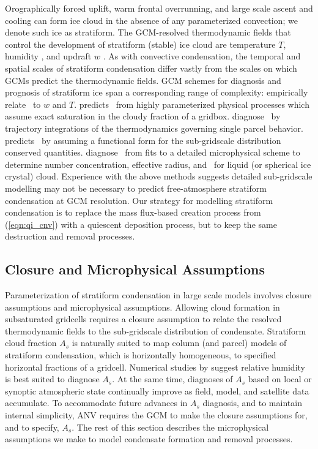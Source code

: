 \documentclass[twoside,agums]{aguplus}
\begin{document}
Orographically forced uplift, warm frontal overrunning, and large
scale ascent and cooling can form ice cloud in the absence of any
parameterized convection; we denote such ice as stratiform.
The GCM-resolved thermodynamic fields that control the development
of stratiform (stable) ice cloud are temperature $T$, humidity \qv,
and updraft $w$ \cite[]{HeD90}.
As with convective condensation, the temporal and spatial scales of
stratiform condensation differ vastly from the scales on which GCMs
predict the thermodynamic fields. 
GCM schemes for diagnosis and prognosis of stratiform ice span a
corresponding range of complexity:
\cite{HeP84} empirically relate \qi\ to $w$ and $T$.
\cite{Sun88} predicts \qi\ from highly parameterized physical
processes which assume exact saturation in the cloudy fraction of a
gridbox.
\cite{HeD90} diagnose \qi\ by trajectory integrations of the
thermodynamics governing single parcel behavior.
\cite{Smi90} predicts \qc\ by assuming a functional form for the
sub-gridscale distribution conserved quantities.
\cite{FeH92} diagnose \qi\ from fits to a detailed microphysical
scheme to determine number concentration, effective radius, and \qc\
for liquid (or spherical ice crystal) cloud.
Experience with the above methods suggests detailed sub-gridscale
modelling may not be necessary to predict free-atmosphere stratiform
condensation at GCM resolution. 
Our strategy for modelling stratiform condensation is to replace the
mass flux-based creation process from (\ref{eqn:qi_cnv}) with a
quiescent deposition process, but to keep the same destruction and
removal processes.

\subsection{Closure and Microphysical Assumptions}

Parameterization of stratiform condensation in large scale models
involves closure assumptions and microphysical assumptions.
Allowing cloud formation in subsaturated gridcells requires a closure 
assumption to relate the resolved thermodynamic fields to the
sub-gridscale distribution of condensate.
Stratiform cloud fraction $A_s$ is naturally suited to map column (and
parcel) models of stratiform condensation, which is horizontally homogeneous,
to specified horizontal fractions of a gridcell.
Numerical studies by \cite{XuK91} suggest relative humidity is best
suited to diagnose $A_s$.
At the same time, diagnoses of $A_s$ based on local or synoptic
atmospheric state continually improve as field, model, and satellite 
data accumulate.
To accommodate future advances in $A_s$ diagnosis, and to maintain
internal simplicity, ANV requires the GCM to make the closure
assumptions for, and to specify, $A_s$. 
The rest of this section describes the microphysical assumptions 
we make to model condensate formation and removal processes. 
\end{document}
